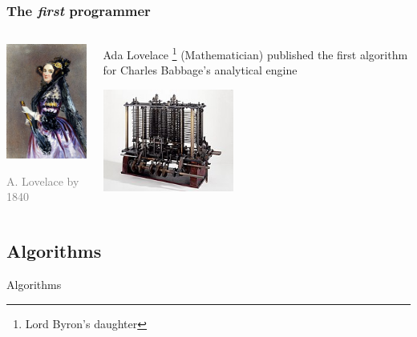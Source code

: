 \documentclass[xcolor=x11names,handout]{beamer}
\newcommand{\light}[1]{\textcolor{gray}{#1}}
\begin{document}
\begin{frame}
\frametitle{The \textit{first} programmer}

\begin{columns}
\begin{column}{0.4\textwidth}
\begin{center}
\includegraphics[width=43mm]{img/Ada_Lovelace_portrait.jpg}

\footnotesize
\light{A. Lovelace by 1840}
\end{center}
\end{column}

\begin{column}{0.55\textwidth}

\alert{Ada Lovelace}%
\footnote{Lord Byron’s daughter}
(Mathematician) published the first algorithm for Charles Babbage’s 
\alert{analytical engine}

\begin{center}
\includegraphics[width=43mm]{img/Babbages_Analytical_Engine_1834-1871.jpg}
\end{center}

\end{column}
\end{columns}
\end{frame}

 
\begin{frame}
\section{Algorithms}
\centering
\alert{Algorithms}
\end{frame}
\end{document}
